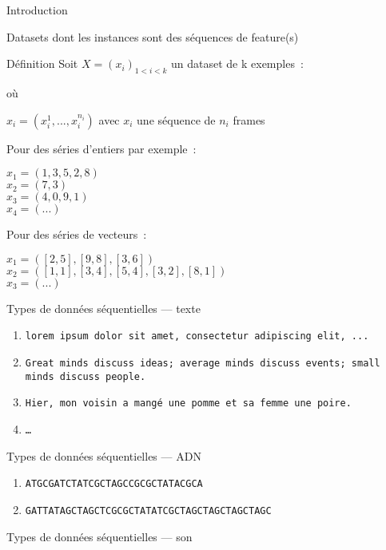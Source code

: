 \begin{frame}{Introduction}
  \begin{center}
    Datasets dont les instances sont des séquences de feature(s)
  \end{center}
\end{frame}

\begin{frame}{Définition}
  Soit $X=(x_i)_{1<i<k}$ un dataset de k exemples~:

  où

  $x_i = (x_{i}^1 , ... , x_{i}^{n_i})$ avec $x_i$ une séquence de $n_i$ frames

  Pour des séries d'entiers par exemple~:

  $x_1 = (1,3,5,2,8)$ \\
  $x_2 = (7,3)$ \\
  $x_3 = (4,0,9,1)$ \\
  $x_4 = (...)$

  Pour des séries de vecteurs~:

  $x_1 = ([2,5],[9,8],[3,6])$ \\
  $x_2 = ([1,1],[3,4],[5,4],[3,2],[8,1])$ \\
  $x_3 = (...)$ 
\end{frame}

\begin{frame}{Types de données séquentielles --- texte}
  \begin{enumerate}
    \item \texttt{lorem ipsum dolor sit amet, consectetur adipiscing elit, ...}
    \item \texttt{Great minds discuss ideas; average minds discuss events; small minds discuss people.}
    \item \texttt{Hier, mon voisin a mangé une pomme et sa femme une poire.}
    \item \texttt{…}
  \end{enumerate}
\end{frame}

\begin{frame}{Types de données séquentielles --- ADN}
  \begin{enumerate}
    \item \texttt{ATGCGATCTATCGCTAGCCGCGCTATACGCA}
    \item \texttt{GATTATAGCTAGCTCGCGCTATATCGCTAGCTAGCTAGCTAGC}
  \end{enumerate}
\end{frame}

\begin{frame}{Types de données séquentielles --- son}
\end{frame}


